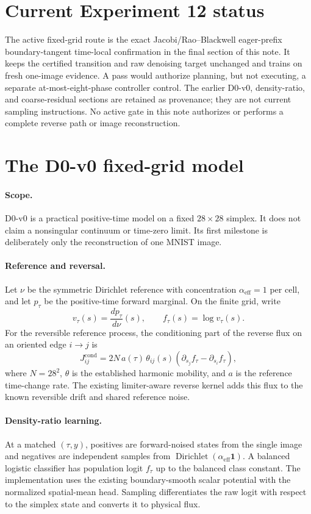 \documentclass[11pt]{article}
\begin{document}
\section*{Current Experiment 12 status}
The active fixed-grid route is the exact Jacobi/Rao--Blackwell eager-prefix
boundary-tangent time-local confirmation in the final section of this note.
It keeps the certified transition and raw denoising target unchanged and
trains on fresh one-image evidence. A pass would authorize planning, but not
executing, a separate at-most-eight-phase controller control. The earlier
D0-v0, density-ratio, and coarse-residual sections are retained as provenance;
they are not current sampling instructions. No active gate in this note
authorizes or performs a complete reverse path or image reconstruction.

\section{The D0-v0 fixed-grid model}

\paragraph{Scope.}
D0-v0 is a practical positive-time model on a fixed $28\times28$ simplex.
It does not claim a nonsingular continuum or time-zero limit. Its first
milestone is deliberately only the reconstruction of one MNIST image.

\paragraph{Reference and reversal.}
Let $\nu$ be the symmetric Dirichlet reference with concentration
$\alpha_{\mathrm{eff}}=1$ per cell, and let $p_\tau$ be the positive-time
forward marginal. On the finite grid, write
\[
  v_\tau(s)=\frac{dp_\tau}{d\nu}(s),
  \qquad f_\tau(s)=\log v_\tau(s).
\]
For the reversible reference process, the conditioning part of the reverse
flux on an oriented edge $i\to j$ is
\[
  J^{\mathrm{cond}}_{ij}
  =2N\,a(\tau)\,\theta_{ij}(s)
    \left(\partial_{s_j}f_\tau-\partial_{s_i}f_\tau\right),
\]
where $N=28^2$, $\theta$ is the established harmonic mobility, and $a$ is the
reference time-change rate. The existing limiter-aware reverse kernel adds
this flux to the known reversible drift and shared reference noise.

\paragraph{Density-ratio learning.}
At a matched $(\tau,y)$, positives are forward-noised states from the single
image and negatives are independent samples from
$\operatorname{Dirichlet}(\alpha_{\mathrm{eff}}\mathbf 1)$. A balanced
logistic classifier has population logit $f_\tau$ up to the balanced class
constant. The implementation uses the existing boundary-smooth scalar
potential with the normalized spatial-mean head. Sampling differentiates the
raw logit with respect to the simplex state and converts it to physical flux.
\end{document}
